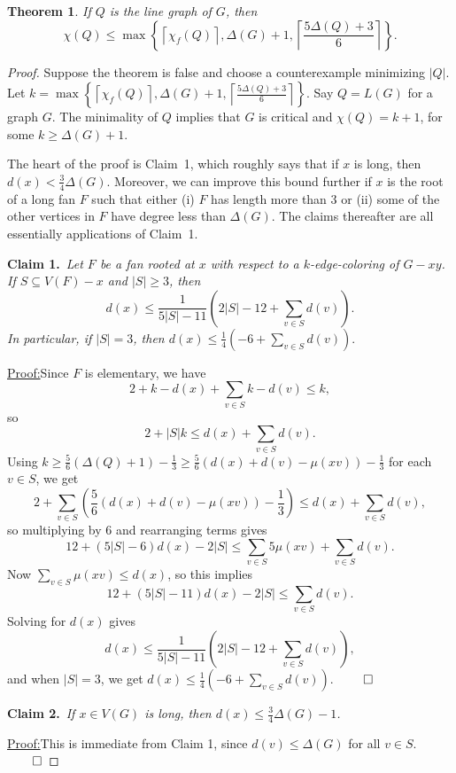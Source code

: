 \documentclass[12pt]{amsart}
\theoremstyle{plain}
\newtheorem{thm}{Theorem}
\theoremstyle{definition}
\theoremstyle{remark}
\newcommand{\set}[1]{\left\{ #1 \right\}}
\newcommand{\card}[1]{\left|#1\right|}
\newcommand{\ceil}[1]{\left\lceil#1\right\rceil}
\newcommand{\parens}[1]{\left( #1 \right)}
\newcommand{\claim}[2]{{\noindent\bf Claim #1.}~{\it #2}~~}
\newenvironment{claimproof}[1]{\par\noindent\underline{Proof:}\space#1}{\leavevmode\unskip\penalty9999
\hbox{}\nobreak\hfill\quad\hbox{$\qed$}}
\begin{document}
\begin{thm}
If $Q$ is the line graph of $G$, then
\[\chi(Q) \le \max\set{\ceil{\chi_f(Q)}, \Delta(G) + 1, \ceil{\frac{5\Delta(Q) + 3}{6}}}.\]
\label{mainhelper}
\end{thm}
\begin{proof}
Suppose the theorem is false and choose a counterexample minimizing $\card{Q}$.
Let $k = \max\set{\ceil{\chi_f(Q)}, \Delta(G) + 1, \ceil{\frac{5\Delta(Q) +
3}{6}}}$. Say $Q = L(G)$ for a graph $G$. The minimality of $Q$ implies that
$G$ is critical and $\chi(Q) = k+1$, for some $k \ge \Delta(G) + 1$.

The heart of the proof is Claim~1, which roughly says that if $x$ is long, then
$d(x)<\frac34\Delta(G)$. Moreover, we can improve this bound further if $x$ is
the root of a long fan $F$ such that either (i) $F$ has length more than 3 or (ii)
some of the other vertices in $F$ have degree less than $\Delta(G)$.  The claims
thereafter are all essentially applications of Claim~1.
\bigskip

\claim{1}{Let $F$ be a fan rooted at $x$ with respect to a $k$-edge-coloring of
$G - xy$.  If $S\subseteq V(F)-x$ and $|S| \ge 3$, then
\[d(x) \le \frac1{5|S|-11}\parens{2|S|-12 + \sum_{v \in S} d(v)}.\]
In particular, if $|S|=3$, then $d(x) \le \frac1{4}\parens{-6 + \sum_{v \in S}
d(v)}.$}
\begin{claimproof}
Since $F$ is elementary, we have
\[2 + k-d(x) + \sum_{v \in S} k - d(v) \le k,\]
so
\[2 + |S|k \le d(x) + \sum_{v \in S} d(v).\]
Using $k \ge \frac56(\Delta(Q) + 1) - \frac13 \ge \frac56(d(x) + d(v) - \mu(xv))
- \frac13$ for each $v
\in S$, we get
\[2 + \sum_{v \in S}\parens{\frac56(d(x) + d(v) - \mu(xv)) -\frac13} \le d(x) +
\sum_{v \in S} d(v),\]
so multiplying by 6 and rearranging terms gives
\[12 + \parens{5|S| - 6}d(x) - 2|S| \le \sum_{v \in S} 5\mu(xv) + \sum_{v \in S} d(v).\]
Now $\sum_{v \in S} \mu(xv) \le d(x)$, so this implies
\[12 + \parens{5|S| - 11}d(x) - 2|S| \le \sum_{v \in S} d(v).\]
Solving for $d(x)$ gives
\[d(x) \le \frac1{5|S|-11}\parens{2|S|-12 + \sum_{v \in S} d(v)},\]
and when $|S| = 3$, we get
$d(x) \le \frac14\parens{-6 + \sum_{v \in S} d(v)}.$
\end{claimproof}
\bigskip

\claim{2}{If $x \in V(G)$ is long, then $d(x) \le \frac34\Delta(G) - 1$.}

\begin{claimproof}
This is immediate from Claim 1, since $d(v)\le \Delta(G)$ for all $v\in S$.
\end{claimproof}
\bigskip


\end{proof}
\end{document}
